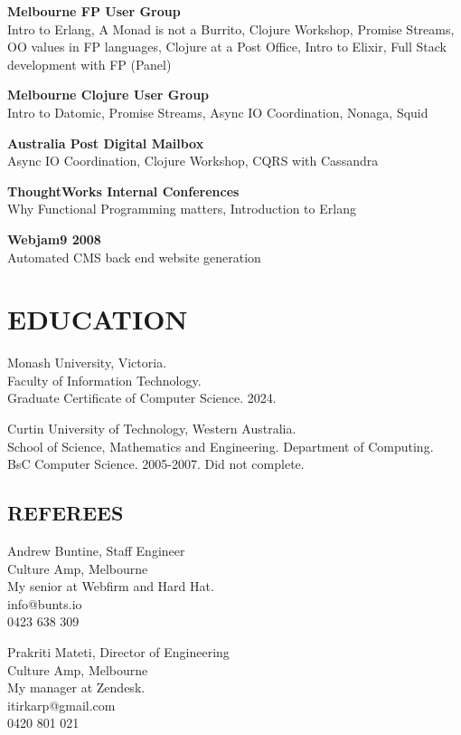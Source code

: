 \documentclass[margin]{res}
\begin{document}
\begin{resume}
\begin{multicols}{2}
    \textbf{Melbourne FP User Group} \\
    Intro to Erlang, A Monad is not a Burrito, Clojure Workshop, Promise
    Streams, OO values in FP languages, Clojure at a Post Office, Intro to
    Elixir, Full Stack development with FP (Panel)

    \textbf{Melbourne Clojure User Group} \\
    Intro to Datomic, Promise Streams, Async IO Coordination, Nonaga, Squid

    \columnbreak

    \textbf{Australia Post Digital Mailbox} \\
    Async IO Coordination, Clojure Workshop, CQRS with Cassandra

    \textbf{ThoughtWorks Internal Conferences} \\
    Why Functional Programming matters, Introduction to Erlang

    \textbf{Webjam9 2008} \\
    Automated CMS back end website generation
  \end{multicols}

  \section{EDUCATION}
  Monash University, Victoria. \\
  Faculty of Information Technology. \\
  Graduate Certificate of Computer Science. 2024.

  Curtin University of Technology, Western Australia. \\
  School of Science, Mathematics and
  Engineering. Department of Computing. \\
  BsC Computer Science. 2005-2007. Did not complete.

  \begin{multicols}{2}
    \section{REFEREES}
    Andrew Buntine, Staff Engineer \\
    Culture Amp, Melbourne \\
    My senior at Webfirm and Hard Hat. \\
    info@bunts.io \\
    0423 638 309

	Prakriti Mateti, Director of Engineering \\
	Culture Amp, Melbourne \\
	My manager at Zendesk. \\
	itirkarp@gmail.com \\
	0420 801 021
  \end{multicols}

\end{resume}

\end{document}
